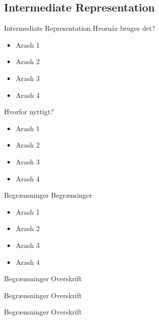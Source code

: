 \subsection{Intermediate Representation}
\begin{frame}{Intermediate Representation}{}
  Hvornår bruges det?
  \begin{itemize}
    \item<1-> Arash 1
    \item<2-> Arash 2
    \item<3-> Arash 3
    \item<4-> Arash 4
  \end{itemize}
  Hvorfor nyttigt?
  \begin{itemize}
    \item<1-> Arash 1
    \item<2-> Arash 2
    \item<3-> Arash 3
    \item<4-> Arash 4
  \end{itemize}
\end{frame}

\begin{frame}{Begrænsninger}{}
  Begrænsinger
  \begin{itemize}
    \item<1-> Arash 1
    \item<2-> Arash 2
    \item<3-> Arash 3
    \item<4-> Arash 4
  \end{itemize}
\end{frame}

\begin{frame}{Begrænsninger}{}
  Overskrift
\end{frame}

\begin{frame}{Begrænsninger}{}
  Overskrift
\end{frame}

\begin{frame}{Begrænsninger}{}
  Overskrift
\end{frame}